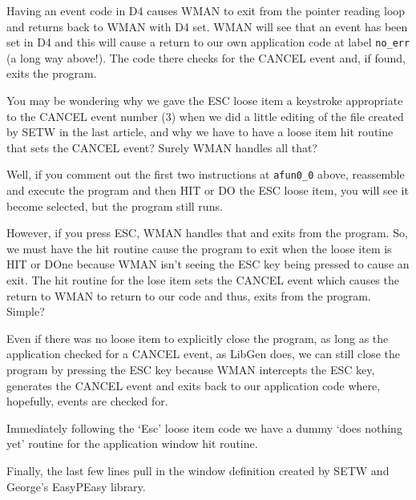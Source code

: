 Having an event code in D4 causes WMAN to
    exit from the pointer reading loop and returns back to
 WMAN with D4 set.
 WMAN will see that an event has been set in D4
    and this will cause a return to our own application code at label
 \texttt{no\_err} (a long way above!). The code there checks for
    the CANCEL event and, if found, exits the program.

\begin{note}
You may be wondering why we gave the ESC loose item a keystroke
      appropriate to the CANCEL event number (3) when we did a little editing
      of the file created by SETW in the last
      article, and why we have to have a loose item hit routine that sets the
      CANCEL event? Surely WMAN handles all
      that?

Well, if you comment out the first two instructions at
 \texttt{afun0\_0} above, reassemble and execute the program
      and then HIT or DO the ESC loose item, you will see it become selected,
      but the program still runs.

However, if you press ESC, WMAN handles
      that and exits from the program. So, we must have the hit routine cause
      the program to exit when the loose item is HIT or DOne because
 WMAN isn't seeing the ESC key being pressed
      to cause an exit. The hit routine for the lose item sets the CANCEL
      event which causes the return to WMAN to
      return to our code and thus, exits from the program. Simple?

Even if there was no loose item to explicitly close the program,
      as long as the application checked for a CANCEL event, as
 LibGen does, we can still close the program
      by pressing the ESC key because WMAN       intercepts the ESC key, generates the CANCEL event and exits back to our
      application code where, hopefully, events are checked for.
\end{note}

Immediately following the `Esc' loose item code we have a dummy
    `does nothing yet' routine for the application window hit routine.

Finally, the last few lines pull in the window definition created by
 SETW and George's
 EasyPEasy library.

